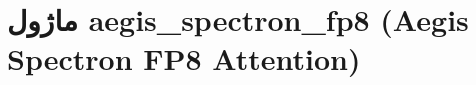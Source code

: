 \section{ماژول aegis\_spectron\_fp8 (Aegis Spectron FP8 Attention)}
\label{sec:module_aegis_spectron_fp8}
